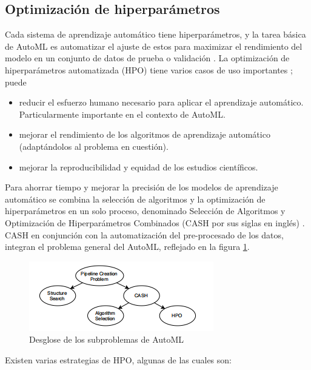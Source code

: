 \subsection{Optimización de hiperparámetros}
Cada sistema de aprendizaje automático tiene hiperparámetros, y la tarea básica de AutoML es automatizar el ajuste de estos para maximizar el rendimiento del modelo en un conjunto de datos de prueba o validación \citep{hastie2009elements}. La optimización de hiperparámetros automatizada (HPO) tiene varios casos de uso importantes \citep{hutter2019automated}; puede
\begin{itemize}
	\item reducir el esfuerzo humano necesario para aplicar el aprendizaje automático. Particularmente importante en el contexto de AutoML.
	\item mejorar el rendimiento de los algoritmos de aprendizaje automático (adaptándolos al problema en cuestión).
	\item mejorar la reproducibilidad y equidad de los estudios científicos.
\end{itemize}
Para ahorrar tiempo y mejorar la precisión de los modelos de aprendizaje automático se combina la selección de algoritmos y la optimización de hiperparámetros en un solo proceso, denominado Selección de Algoritmos y Optimización de Hiperparámetros Combinados (CASH por sus siglas en inglés) \citep{tuggener2019automated}. \\
CASH en conjunción con la automatización del pre-procesado de los datos, integran el problema general del AutoML, reflejado en la figura \ref{fig:desglose-de-los-subproblemas-de-automl}. 
\begin{figure}[H]
	\centering
	\includegraphics[width=0.6\linewidth]{"figuras/Ray/Desglose de los subproblemas de AutoML"}
	\caption{Desglose de los subproblemas de AutoML \citep{zoller2021benchmark}}
	\label{fig:desglose-de-los-subproblemas-de-automl}
\end{figure} 
Existen varias estrategias de HPO, algunas de las cuales son:
